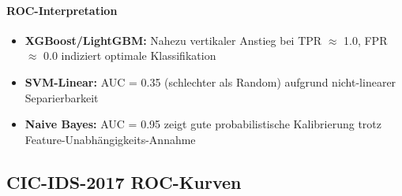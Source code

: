 \documentclass[11pt,a4paper]{article}
\begin{document}
    \paragraph{ROC-Interpretation}
    \begin{itemize}
        \item \textbf{XGBoost/LightGBM:} Nahezu vertikaler Anstieg bei TPR $\approx$ 1.0, 
        FPR $\approx$ 0.0 indiziert optimale Klassifikation
        \item \textbf{SVM-Linear:} AUC = 0.35 (schlechter als Random) aufgrund 
        nicht-linearer Separierbarkeit
        \item \textbf{Naive Bayes:} AUC = 0.95 zeigt gute probabilistische Kalibrierung 
        trotz Feature-Unabhängigkeits-Annahme
    \end{itemize}
    
    \subsection{CIC-IDS-2017 ROC-Kurven}
    \label{app:cic_roc}
    
\end{document}
